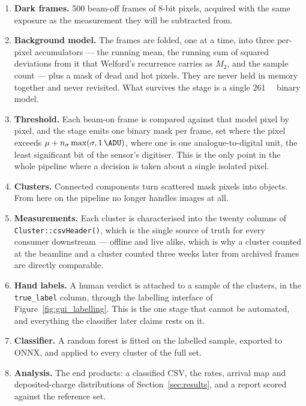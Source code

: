 \documentclass[a4paper,headsepline,oneside,11pt]{scrartcl}
\begin{document}
\begin{enumerate}
  \item \textbf{Dark frames.} 500 beam-off frames of  8-bit
  pixels, acquired with the same exposure as the measurement they will be
  subtracted from.

  \item \textbf{Background model.} The frames are folded, one at a time, into
  three per-pixel accumulators --- the running mean, the running sum of squared
  deviations from it that Welford's recurrence carries as $M_2$, and the sample
  count --- plus
  a mask of dead and hot pixels. They are never held in memory together and never
  revisited. What survives the stage is a single \SI{261}{\mega\byte} binary model.

  \item \textbf{Threshold.} Each beam-on frame is compared against that model
  pixel by pixel, and the stage emits one binary mask per frame, set where the
  pixel exceeds $\mu + n_\sigma \max(\sigma, \SI{1}{\ADU})$, where one \si{\ADU}
  is one analogue-to-digital unit, the least significant bit of the sensor's
  digitiser. This is the only
  point in the whole pipeline where a decision is taken about a single isolated
  pixel.

  \item \textbf{Clusters.} Connected components turn scattered mask pixels into
  objects. From here on the pipeline no longer handles images at all.

  \item \textbf{Measurements.} Each cluster is characterised into the twenty
  columns of \texttt{Cluster::\allowbreak csvHeader()}, which is the single source of truth
  for every consumer downstream --- offline and live alike, which is why a
  cluster counted at the beamline and a cluster counted three weeks later from
  archived frames are directly comparable.

  \item \textbf{Hand labels.} A human verdict is attached to a sample of the
  clusters, in the \texttt{true\_label} column, through the labelling interface
  of Figure~\ref{fig:gui_labelling}.
  This is the one stage that cannot be automated, and everything the classifier
  later claims rests on it.

  \item \textbf{Classifier.} A random forest is fitted on the labelled sample,
  exported to ONNX, and applied to every cluster of the full set.

  \item \textbf{Analysis.} The end products: a classified CSV, the rates, arrival
  map and deposited-charge distributions of Section~\ref{sec:results}, and a
  report scored against the reference set.
\end{enumerate}
\end{document}
